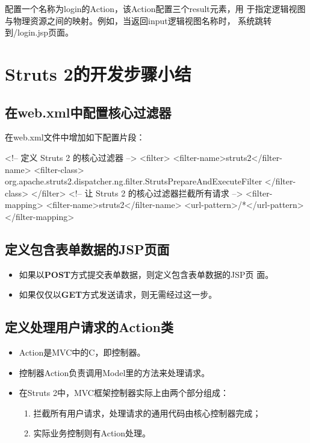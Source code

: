 {\Blue\kai 配置一个名称为login的Action，该Action配置三个result元素，用
  于指定逻辑视图与物理资源之间的映射。例如，当返回input逻辑视图名称时，
  系统跳转到/login.jsp页面。}

\section{Struts 2的开发步骤小结}

\subsection{在web.xml中配置核心过滤器}

在web.xml文件中增加如下配置片段：

\begin{xmlCode}
<!-- 定义 Struts 2 的核心过滤器 -->
<filter>
  <filter-name>struts2</filter-name>
  <filter-class>
    org.apache.struts2.dispatcher.ng.filter.StrutsPrepareAndExecuteFilter
  </filter-class>
</filter>
<!-- 让 Struts 2 的核心过滤器拦截所有请求 -->
<filter-mapping>
  <filter-name>struts2</filter-name>
  <url-pattern>/*</url-pattern>
</filter-mapping>  
\end{xmlCode}


\subsection{定义包含表单数据的JSP页面}

\begin{itemize}
\item 如果以{\bf\Red POST}方式提交表单数据，则定义包含表单数据的JSP页
  面。
\item 如果仅仅以{\bf\Blue GET}方式发送请求，则无需经过这一步。
\end{itemize}

\subsection{定义处理用户请求的Action类}

\begin{itemize}
\item Action是MVC中的C，即控制器。
\item 控制器Action负责调用Model里的方法来处理请求。
\item 在Struts 2中，MVC框架控制器实际上由两个部分组成：
  \begin{enumerate}\kai
  \item 拦截所有用户请求，处理请求的通用代码由核心控制器完成；
  \item 实际业务控制则有Action处理。
  \end{enumerate}
\end{itemize}

